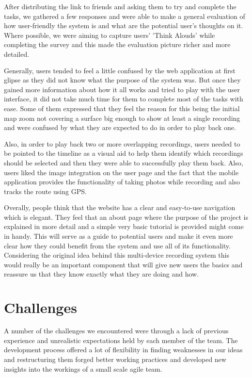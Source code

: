 \documentclass{l3proj}
\begin{document}
After distributing the link to friends and asking them to try and complete the tasks, we gathered a few responses and were able to make a general evaluation of how user-friendly the system is and what are the potential user's thoughts on it. Where possible, we were aiming to capture users' 'Think Alouds' while completing the survey and this made the evaluation picture richer and more detailed.

Generally, users tended to feel a little confused by the web application at first glipse as they did not know what the purpose of the system was. But once they gained more information about how it all works and tried to play with the user interface, it did not take much time for them to complete most of the tasks with ease. Some of them expressed that they feel the reason for this being the initial map zoom not covering a surface big enough to show at least a single recording and were confused by what they are expected to do in order to play back one.

Also, in order to play back two or more overlapping recordings, users needed to be pointed to the timeline as a visual aid to help them identify which recordings should be selected and then they were able to successfully play them back. Also, users liked the image integration on the user page and the fact that the mobile application provides the functionality of taking photos while recording and also tracks the route using GPS.

Overally, people think that the website has a clear and easy-to-use navigation which is elegant. They feel that an about page where the purpose of the project is explained in more detail and a simple very basic tutorial is provided might come in handy. This will serve as a guide to potential users and make it even more clear how they could benefit from the system and use all of its functionality. Considering the original idea behind this multi-device recording system this would really be an important component that will give new users the basics and reassure us that they know exactly what they are doing and how.

\chapter{Challenges}
\label{Challenges}

A number of the challenges we encountered were through a lack of previous
experience and unrealistic expectations held by each member of the team. The
development process offered a lot of flexibility in finding weaknesses in our
ideas and restructuring them forged better working practices and developed new
insights into the workings of a small scale agile team.
\end{document}
